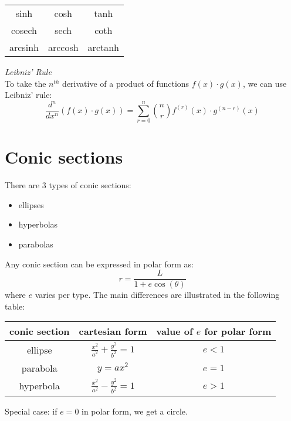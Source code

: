 \documentclass{scrartcl}
\begin{document}
\begin{center}
\begin{tabular}{c c c}
sinh & cosh & tanh \\
cosech & sech & coth \\
arcsinh & arccosh & arctanh \\
\end{tabular}
\end{center}
\textit{Leibniz' Rule}
\\
To take the $ n^{th} $ derivative of a product of functions $ f(x) \cdot g(x) $, we can use Leibniz' rule:
\begin{equation}
\frac{d^{n}}{d x^{n}} (f(x) \cdot g(x)) = \sum_{r=0}^{n} {n \choose r} f^{(r)}(x) \cdot g^{(n-r)}(x)
\end{equation}

\section{Conic sections}
There are 3 types of conic sections:
\begin{itemize}
\item ellipses
\item hyperbolas
\item parabolas
\end{itemize}
Any conic section can be expressed in polar form as:
\begin{equation}
r = \frac{L}{1 + e \cos(\theta)}
\end{equation}
where $ e $ varies per type. The main differences are illustrated in the following table:
\begin{center}
\begin{tabular}{|c|c|c|}
\hline
\textbf{conic section} & \textbf{cartesian form} & \textbf{value of $ e $ for polar form} \\
\hline
ellipse & $ \frac{x^{2}}{a^{2}} + \frac{y^{2}}{b^{2}} = 1 $ & $ e < 1 $ \\
\hline
parabola & $ y = ax^{2} $ & $ e = 1 $ \\
\hline
hyperbola & $ \frac{x^{2}}{a^{2}} - \frac{y^{2}}{b^{2}} = 1 $ & $ e > 1 $ \\
\hline
\end{tabular}
\end{center}
Special case: if $ e = 0 $ in polar form, we get a circle.
\end{document}
